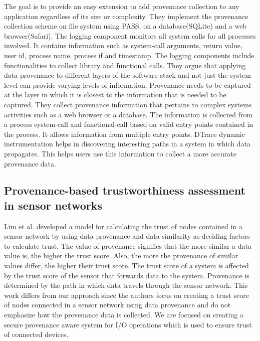 The goal is to provide an easy extension to add provenance collection to any application regardless of its size or complexity. They implement the provenance collection scheme on file system using PASS, on a database(SQLite) and a web browser(Safari). 
The logging component monitors all system calls for all processes involved. It contains information such as system-call arguments, return value, user id, process name, process if and timestamp. The logging components include functionalities to collect library and functional calls. They argue that applying data provenance to different layers of the software stack and not just the system level can provide varying levels of information. Provenance needs to be captured at the layer in which it is closest to the information that is needed to be captured. They collect provenance information that pertains to complex systems activities such as a web browser or a database. The information is collected from a process system-call and functional-call based on valid entry points contained in the process. It allows information from multiple entry points. DTrace dynamic instrumentation helps in discovering interesting paths in a system in which data propagates. This helps users use this information to collect a more accurate provenance data.


\subsection{Provenance-based trustworthiness assessment in sensor networks}
Lim et al. \cite{lim} developed a
model for calculating the trust of nodes contained in a sensor network by using data
provenance and data similarity as deciding factors to calculate trust. The value of
provenance signifies that the more similar a data value is, the higher the trust score.
Also, the more the provenance of similar values differ, the higher their trust score. The trust score of a system is affected by the trust score of the sensor that forwards data to the system. Provenance is determined by the path in which data travels through the sensor network. This work differs from our approach since the authors focus on creating a trust score
of nodes connected in a sensor network using data provenance and do not emphasize
how the provenance data is collected. We are focused on creating a secure
provenance aware system for I/O operations which is used to ensure trust of
connected devices. 


